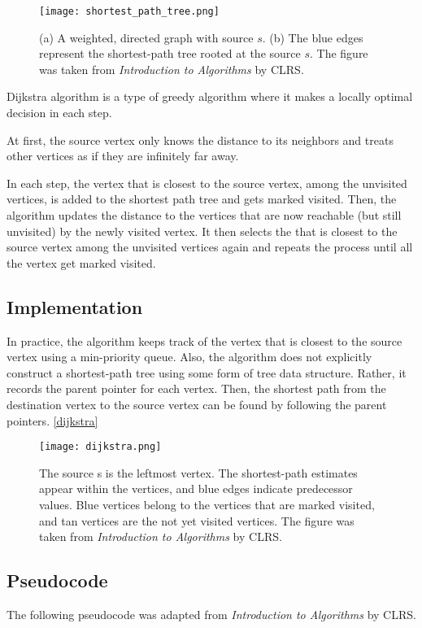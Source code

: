 \documentclass{article}
\begin{document}
\begin{figure} 
\centering
\texttt{[image: shortest\_path\_tree.png]}
\caption{(a) A weighted, directed graph with source $s$. (b) The blue edges represent the shortest-path tree rooted at the source $s$. The figure was taken from \textit{Introduction to Algorithms} by CLRS\cite{CLRS}.} 
\label{shortest_path_tree}
\end{figure}

Dijkstra algorithm is a type of greedy algorithm where it makes a locally optimal decision in each step.

At first, the source vertex only knows the distance to its neighbors and treats other vertices as if they are infinitely far away. 

In each step, the vertex that is closest to the source vertex,
among the unvisited vertices, is added to the shortest path tree and gets marked visited. Then, the algorithm updates the distance to the vertices that are now reachable (but still unvisited) by the newly visited vertex. It then selects the that is closest to the source vertex among the unvisited vertices again and repeats the process until all the vertex get marked visited.

\subsection{Implementation}
In practice, the algorithm keeps track of the vertex that is closest to the source vertex using a min-priority queue. Also, the algorithm does not explicitly construct a shortest-path tree using some form of tree data structure. Rather, it records the parent pointer for each vertex. Then, the shortest path from the destination vertex to the source vertex can be found by following the parent pointers.
\autoref{dijkstra}

\begin{figure}
\centering
\texttt{[image: dijkstra.png]}
\caption{The source s is the leftmost vertex. The shortest-path estimates appear within the vertices, and blue edges indicate predecessor values. Blue vertices belong to the vertices that are marked visited, and tan vertices are the not yet visited vertices. The figure was taken from \textit{Introduction to Algorithms} by CLRS\cite{CLRS}.}
\label{dijkstra}
\end{figure}

\subsection{Pseudocode}
The following pseudocode was adapted from \textit{Introduction to Algorithms} by CLRS\cite{CLRS}.
\end{document}
